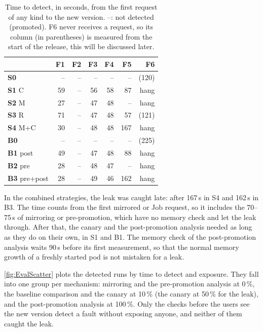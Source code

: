 \begin{table}[ht]
	\footnotesize
	\centering
	\begin{tabular}{ l r r r r r r }
		\toprule
		& F1 & F2 & F3 & F4 & F5 & F6 \\
		\midrule
		\textbf{S0} & -- & -- & -- & -- & -- & (120) \\
		\textbf{S1} C & 59 & -- & 56 & 58 & 87 & hang \\
		\textbf{S2} M & 27 & -- & 47 & 48 & -- & hang \\
		\textbf{S3} R & 71 & -- & 47 & 48 & 57 & (121) \\
		\textbf{S4} M+C & 30 & -- & 48 & 48 & 167 & hang \\
		\midrule
		\textbf{B0} & -- & -- & -- & -- & -- & (225) \\
		\textbf{B1} post & 49 & -- & 47 & 48 & 88 & hang \\
		\textbf{B2} pre & 28 & -- & 48 & 47 & -- & hang \\
		\textbf{B3} pre+post & 28 & -- & 49 & 46 & 162 & hang \\
		\bottomrule
	\end{tabular}
	\caption{Time to detect, in seconds, from the first request of any kind to the new version. --: not detected (promoted). F6 never receives a request, so its column (in parentheses) is measured from the start of the release, this will be discussed later.}
	\label{tab:EvalTTD}
\end{table}

In the combined strategies, the leak was caught late: after 167\,s in S4 and 162\,s in B3. The time counts from the first mirrored or Job request, so it includes the 70--75\,s of mirroring or pre-promotion, which have no memory check and let the leak through. After that, the canary and the post-promotion analysis needed as long as they do on their own, in S1 and B1. The memory check of the post-promotion analysis waits 90\,s before its first measurement, so that the normal memory growth of a freshly started pod is not mistaken for a leak.

\autoref{fig:EvalScatter} plots the detected runs by time to detect and exposure. They fall into one group per mechanism: mirroring and the pre-promotion analysis at 0\,\%, the baseline comparison and the canary at 10\,\% (the canary at 50\,\% for the leak), and the post-promotion analysis at 100\,\%. Only the checks before the users see the new version detect a fault without exposing anyone, and neither of them caught the leak.

